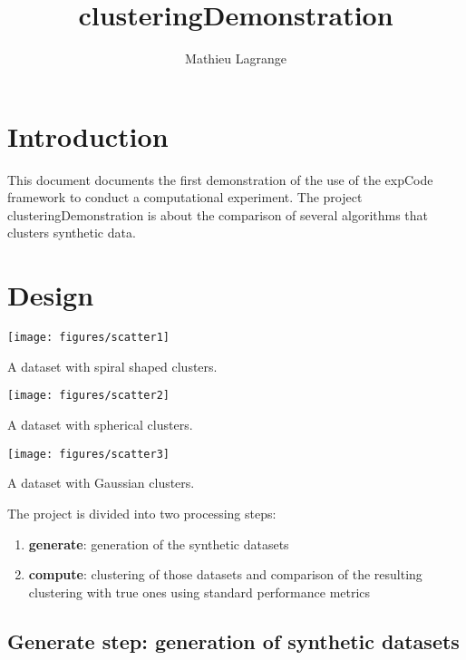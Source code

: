 \documentclass[12pt,a4paper,fleqn]{tufte-handout}
\title{clusteringDemonstration}
\author{ Mathieu Lagrange }
\begin{document}
 
  
\maketitle 
  
\section{Introduction}


This document documents the first demonstration of the use of the expCode framework to conduct a computational experiment. The project clusteringDemonstration is about the comparison of several algorithms that clusters synthetic data.

\section{Design}

\begin{marginfigure}
\texttt{[image: figures/scatter1]}
\caption{A dataset with spiral shaped clusters.}
\label{scatter}
\end{marginfigure}

\begin{marginfigure}
\texttt{[image: figures/scatter2]}
\caption{A dataset with spherical clusters.}
\label{scatter}
\end{marginfigure}

\begin{marginfigure}
\texttt{[image: figures/scatter3]}
\caption{A dataset with Gaussian clusters.}
\label{scatter}
\end{marginfigure}

 The project is divided into two processing steps:
\begin{enumerate}
\item \textbf{generate}: generation of the synthetic datasets
\item \textbf{compute}: clustering of those datasets and comparison of the resulting clustering with true ones using standard performance metrics
\end{enumerate}

\subsection{\textbf{Generate step}: generation of synthetic datasets}
\end{document}
